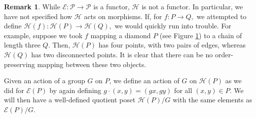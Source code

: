 \documentclass[10 pt]{amsart}
\theoremstyle{plain}
\theoremstyle{definition}
\newtheorem{rem}[thm]{Remark}
\theoremstyle{remark}
\numberwithin{equation}{section}
\begin{document}
\begin{rem}
While $\mathcal E:\mathcal P \rightarrow \mathcal P$ is a functor, $\mathcal H$ is not a functor. In particular, we have not specified how $\mathcal H$ acts on morphisms. If, for $f:P \rightarrow Q,$ we attempted to define $\mathcal H(f):\mathcal H(P) \rightarrow \mathcal H(Q),$ we would quickly run into trouble. For example, suppose we took $f$ mapping a diamond $P$ (see Figure \ref{fig:h_morphism}) to a chain of length three $Q$. Then, $\mathcal H(P)$ has four points, with two pairs of edges, whereas $\mathcal H(Q)$ has two disconnected points. It is clear that there can be no order-preserving mapping between these two objects.

\begin{figure}[h!]
\label{fig:h_morphism}
\begin{center}
\quad
{}\quad
{} \quad
{}
\end{center}
\caption{}
\end{figure}
\end{rem}



Given an action of a group $G$ on $P$, we define an action of $G$ on $\mathcal{H}(P)$ as we did for $\mathcal{E}(P)$ by again defining $g\cdot (x,y) = (gx,gy)$ for all $(x,y)\in P$.  We will then have a well-defined quotient poset $\mathcal{H}(P)/G$ with the same elements as $\mathcal{E}(P)/G$.
\end{document}
